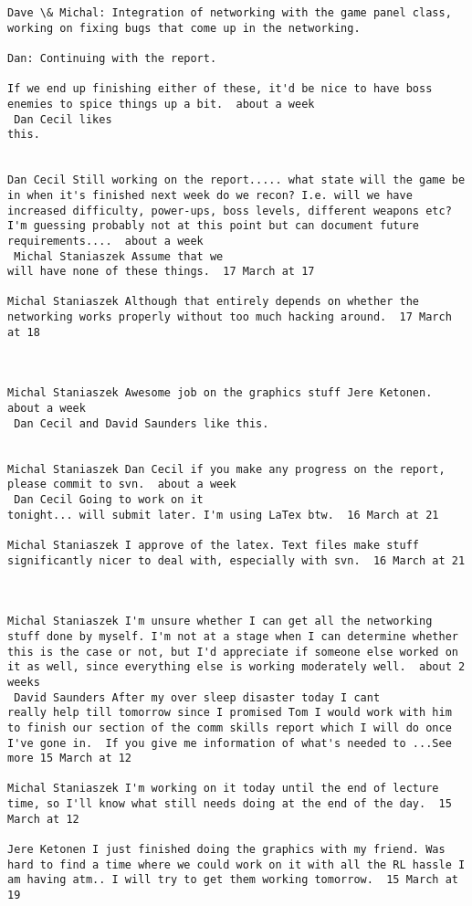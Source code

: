 \begin{verbatim}
Dave \& Michal: Integration of networking with the game panel class,
working on fixing bugs that come up in the networking.

Dan: Continuing with the report.

If we end up finishing either of these, it'd be nice to have boss
enemies to spice things up a bit.  about a week 
 Dan Cecil likes
this.


Dan Cecil Still working on the report..... what state will the game be
in when it's finished next week do we recon? I.e. will we have
increased difficulty, power-ups, boss levels, different weapons etc?
I'm guessing probably not at this point but can document future
requirements....  about a week 
 Michal Staniaszek Assume that we
will have none of these things.  17 March at 17

Michal Staniaszek Although that entirely depends on whether the
networking works properly without too much hacking around.  17 March
at 18



Michal Staniaszek Awesome job on the graphics stuff Jere Ketonen.
about a week 
 Dan Cecil and David Saunders like this.


Michal Staniaszek Dan Cecil if you make any progress on the report,
please commit to svn.  about a week 
 Dan Cecil Going to work on it
tonight... will submit later. I'm using LaTex btw.  16 March at 21

Michal Staniaszek I approve of the latex. Text files make stuff
significantly nicer to deal with, especially with svn.  16 March at 21



Michal Staniaszek I'm unsure whether I can get all the networking
stuff done by myself. I'm not at a stage when I can determine whether
this is the case or not, but I'd appreciate if someone else worked on
it as well, since everything else is working moderately well.  about 2
weeks 
 David Saunders After my over sleep disaster today I cant
really help till tomorrow since I promised Tom I would work with him
to finish our section of the comm skills report which I will do once
I've gone in.  If you give me information of what's needed to ...See
more 15 March at 12

Michal Staniaszek I'm working on it today until the end of lecture
time, so I'll know what still needs doing at the end of the day.  15
March at 12

Jere Ketonen I just finished doing the graphics with my friend. Was
hard to find a time where we could work on it with all the RL hassle I
am having atm.. I will try to get them working tomorrow.  15 March at
19




\end{verbatim}
